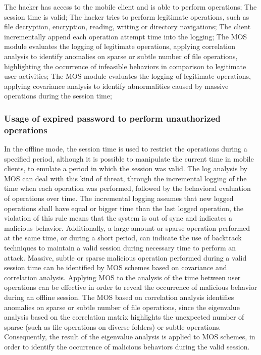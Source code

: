 \documentclass[twocolumn]{svjour3}          %
\begin{document}
The hacker has access to the mobile client and is able to perform operations;
The session time is valid;
The hacker tries to perform legitimate operations, such as file decryption, encryption, reading, writing or directory navigations;
The client incrementally append each operation attempt time into the logging;
The MOS module evaluates the logging of legitimate operations, applying correlation analysis to identify anomalies on sparse or subtle number of file operations, highlighting the occurrence of infeasible behaviors in comparison to legitimate user activities;
The MOS module evaluates the logging of legitimate operations, applying covariance analysis to identify abnormalities caused by massive operations during the session time;

\subsubsection{Usage of expired password to perform unauthorized operations }
\label{sec_attacker_expired}
In the offline mode, the session time is used to restrict the operations during a specified period, although it is possible to manipulate the current time in mobile clients, to emulate a period in which the session was valid. The log analysis by MOS can deal with this kind of threat, through the incremental logging of the time when each operation was performed, followed by the behavioral evaluation of operations over time. 
The incremental logging assumes that new logged operations shall have equal or bigger time than the last logged operation, the violation of this rule means that the system is out of sync and indicates a malicious behavior. Additionally, a large amount or sparse operation performed at the same time, or during a short period, can indicate the use of backtrack techniques to maintain a valid session during necessary time to perform an attack. Massive, subtle or sparse malicious operation performed during a valid session time can be identified by MOS schemes based on covariance and correlation analysis.
Applying MOS to the analysis of the time between user operations can be effective in order to reveal the occurrence of malicious behavior during an offline session. The MOS based on correlation analysis identifies anomalies on sparse or subtle number of file operations, since the eigenvalue analysis based on the correlation matrix highlights the unexpected number of sparse (such as file operations on diverse folders) or subtle operations. Consequently, the result of the eigenvalue analysis is applied to MOS schemes, in order to identify the occurrence of malicious behaviors during the valid session.
\end{document}

